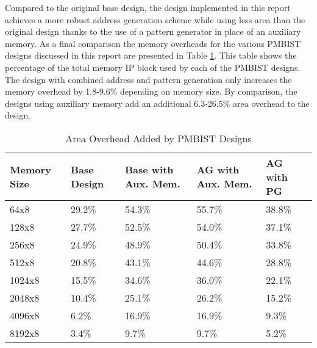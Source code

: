 Compared to the original base design, the design implemented in this report achieves a more robust address generation scheme while using less area than the original design thanks to the use of a pattern generator in place of an auxiliary memory.  As a final comparison the memory overheads for the various PMBIST designs discussed in this report are presented in Table \ref{tab:all_overhead}.  This table shows the percentage of the total memory IP block used by each of the PMBIST designs.  The design with combined address and pattern generation only increases the memory overhead by 1.8-9.6\% depending on memory size.  By comparison, the designs using auxiliary memory add an additional 6.3-26.5\% area overhead to the design.  

\begin{table}[h]
\caption{Area Overhead Added by PMBIST Designs}
\centering
\begin{tabular}{|p{0.75in}| p{0.6in}| p{0.9in}| p{0.9in}| p{0.6in}|}
\hline
Memory Size & Base Design & Base with Aux. Mem. & AG with Aux. Mem. & AG with PG  \\
\hline\hline
64x8   & 29.2\% & 54.3\% & 55.7\% & 38.8\% \\
128x8  & 27.7\% & 52.5\% & 54.0\% & 37.1\% \\
256x8  & 24.9\% & 48.9\% & 50.4\% & 33.8\% \\
512x8  & 20.8\% & 43.1\% & 44.6\% & 28.8\% \\
1024x8 & 15.5\% & 34.6\% & 36.0\% & 22.1\% \\
2048x8 & 10.4\% & 25.1\% & 26.2\% & 15.2\% \\
4096x8 &  6.2\% & 16.9\% & 16.9\% &  9.3\% \\
8192x8 &  3.4\% &  9.7\% &  9.7\% &  5.2\% \\ [0.5ex]
\hline
\end{tabular}
\label{tab:all_overhead}
\end{table}




